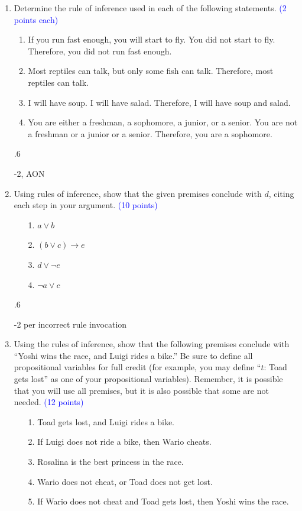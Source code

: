 \documentclass{article}
\newcommand{\pt}[1]{\textcolor{blue}{(#1 points)}}
\newcommand{\pte}[1]{\textcolor{blue}{(#1 points each)}}
\newenvironment{rubric}
{
\par
\begin{spacing}{.6}
\begin{itshape}
\color{red}

}
{
\end{itshape}
\end{spacing}
\par
}
\begin{document}
\clearpage
\begin{enumerate}
\item Determine the rule of inference used in each of the following statements. \pte 2
\begin{enumerate}
    \item If you run fast enough, you will start to fly. You did not start to fly. Therefore, you did not run fast enough.
    \item Most reptiles can talk, but only some fish can talk. Therefore, most reptiles can talk.
    \item I will have soup. I will have salad. Therefore, I will have soup and salad.
    \item You are either a freshman, a sophomore, a junior, or a senior. You are not a freshman or a junior or a senior. Therefore, you are a sophomore.
\end{enumerate}

\begin{rubric}
-2, AON
\end{rubric}

\item Using rules of inference, show that the given premises conclude with $d$, citing each step in your argument. \pt{10}

\begin{enumerate}
    \item[1.] $a \lor b$
    \item[2.] $(b \lor c) \rightarrow e$
    \item[3.] $d \lor \neg e$
    \item[4.] $\neg a \lor c$
\end{enumerate}

\begin{rubric}
-2 per incorrect rule invocation
\end{rubric}

\item Using the rules of inference, show that the following premises conclude with “Yoshi wins the race, and Luigi rides a bike.” Be sure to define all propositional variables for full credit (for example, you may define “$t$: Toad gets lost” as one of your propositional variables). Remember, it is possible that you will use all premises, but it is also possible that some are not needed. \pt{12}

\begin{enumerate}
    \item[1.] Toad gets lost, and Luigi rides a bike.
    \item[2.] If Luigi does not ride a bike, then Wario cheats.
    \item[3.] Rosalina is the best princess in the race.
    \item[4.] Wario does not cheat, or Toad does not get lost.
    \item[5.] If Wario does not cheat and Toad gets lost, then Yoshi wins the race.
\end{enumerate}


\end{enumerate}
\end{document}

